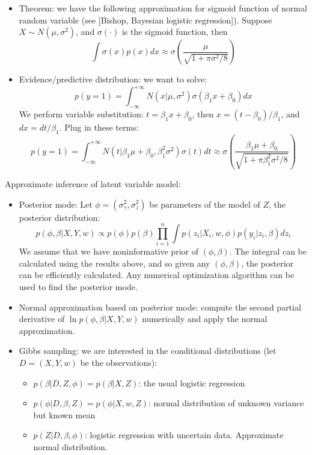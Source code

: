 \documentclass[11pt]{article}
\begin{document}
\begin{enumerate}
\begin{itemize}
\item Theorem: we have the following approximation for sigmoid function of normal random variable (see [Bishop, Bayesian logistic regression]). Suppose $X \sim N(\mu,\sigma^2)$, and $\sigma(\cdot)$ is the sigmoid function, then
\begin{equation}
\int \sigma(x) p(x) dx \approx \sigma\left(\frac{\mu}{\sqrt{1 + \pi \sigma^2 / 8}}\right)	
\end{equation}

\item Evidence/predictive distribution: we want to solve: 
\begin{equation}
p(y=1) = \int_{-\infty}^{+\infty} N(x|\mu,\sigma^2) \sigma(\beta_1 x + \beta_0) dx	
\end{equation}
We perform variable substitution: $t = \beta_1 x + \beta_0$, then $x = (t - \beta_0)/\beta_1$, and $dx = dt/\beta_1$. Plug in these terms: 
\begin{equation}
p(y=1) = \int_{-\infty}^{+\infty} N(t|\beta_1 \mu + \beta_0, \beta_1^2 \sigma^2) \sigma(t) dt \approx \sigma\left( \frac{\beta_1 \mu + \beta_0}{\sqrt{1 + \pi \beta_1^2 \sigma^2/8}} \right)
\end{equation}

\end{itemize}

Approximate inference of latent variable model: 
\begin{itemize}
\item Posterior mode: Let $\phi = (\sigma_{\gamma}^2, \sigma_z^2)$ be parameters of the model of $Z$, the posterior distribution:  
\begin{equation}
p(\phi,\beta|X,Y,w) \propto p(\phi) p(\beta) \prod_{i=1}^n \int p(z_i|X_i,w,\phi) p(y_i|z_i,\beta) dz_i	
\end{equation}
We assume that we have noninformative prior of $(\phi,\beta)$. The integral can be calculated using the results above, and so given any $(\phi,\beta)$, the posterior can be efficiently calculated. Any numerical optimization algorithm can be used to find the posterior mode. 

\item Normal approximation based on posterior mode: compute the second partial derivative of $\ln p(\phi,\beta|X,Y,w)$ numerically and apply the normal approximation. 

\item Gibbs sampling: we are interested in the conditional distributions (let $D = (X,Y,w)$ be the observations): 
\begin{itemize}
	\item $p(\beta|D,Z,\phi) = p(\beta|X,Z)$: the usual logistic regression
	\item $p(\phi|D,\beta,Z) = p(\phi|X,w,Z)$: normal distribution of unknown variance but known mean
	\item $p(Z|D,\beta,\phi)$: logistic regression with uncertain data. Approximate normal distribution. 
\end{itemize}


\end{itemize}
\end{enumerate}
\end{document}
